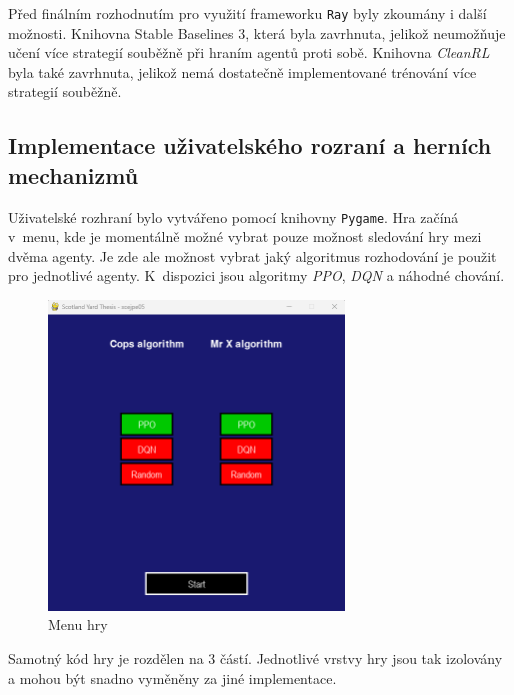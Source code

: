 Před finálním rozhodnutím pro využití frameworku \texttt{Ray} byly zkoumány i další možnosti.
Knihovna Stable Baselines 3, která byla zavrhnuta, jelikož neumožňuje učení více strategií souběžně při hraním agentů proti sobě.
Knihovna \textit{CleanRL} byla také zavrhnuta, jelikož nemá dostatečně implementované trénování více strategií souběžně.

\subsection{Implementace uživatelského rozraní a herních mechanizmů}\label{subsec:implementace-uzivatelskeho-rozrani-a-hernich-mechanizmu}

Uživatelské rozhraní bylo vytvářeno pomocí knihovny \texttt{Pygame}.
Hra začíná v~menu, kde je momentálně možné vybrat pouze možnost sledování hry mezi dvěma agenty.
Je zde ale možnost vybrat jaký algoritmus rozhodování je použit pro jednotlivé agenty.
K~dispozici jsou algoritmy \emph{PPO}, \emph{DQN} a náhodné chování.

\begin{figure}[H]
	\centering
	\includegraphics[width=0.7\textwidth]{obrazky-figures/game_title}
	\caption{Menu hry}\label{fig:game_title}
\end{figure}

Samotný kód hry je rozdělen na 3 částí.
Jednotlivé vrstvy hry jsou tak izolovány a mohou být snadno vyměněny za jiné implementace.

